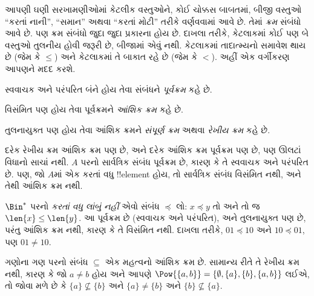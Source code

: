 \documentclass[../../../include/open-logic-section]{subfiles}
\begin{document}

\begin{explain}
આપણી ઘણી સરખામણીઓમાં કેટલીક વસ્તુઓને, કોઈ ચોક્કસ બાબતમાં,
બીજી વસ્તુઓ “કરતાં નાની”, “સમાન” અથવા “કરતાં મોટી”
તરીકે વર્ણવવામાં આવે છે. તેમાં \emph{ક્રમ} સંબંધો આવે છે.
પણ ક્રમ સંબંધો જુદા જુદા પ્રકારના હોય છે. દાખલા તરીકે,
કેટલાકમાં કોઈ પણ બે વસ્તુઓ તુલનીય હોવી જરૂરી છે,
બીજામાં એવું નથી. કેટલાકમાં તાદાત્મ્યનો સમાવેશ થાય છે
(જેમ કે $\le$) અને કેટલાકમાં તે બાકાત રહે છે (જેમ કે $<$).
અહીં એક વર્ગીકરણ આપણને મદદ કરશે.
\end{explain}

\begin{defn}[પૂર્વક્રમ]
સ્વવાચક અને પરંપરિત બંને હોય તેવા સંબંધને \emph{પૂર્વક્રમ} કહે છે.
\end{defn}

\begin{defn}[આંશિક ક્રમ]
વિસંમિત પણ હોય તેવા પૂર્વક્રમને \emph{આંશિક ક્રમ} કહે છે.
\end{defn}

\begin{defn}[રેખીય ક્રમ]
તુલનાયુક્ત પણ હોય તેવા આંશિક ક્રમને \emph{સંપૂર્ણ ક્રમ}
અથવા \emph{રેખીય ક્રમ} કહે છે.
\end{defn}

\begin{ex}
દરેક રેખીય ક્રમ આંશિક ક્રમ પણ છે, અને દરેક આંશિક ક્રમ
પૂર્વક્રમ પણ છે, પણ ઊલટાં વિધાનો સાચાં નથી.
$A$ પરનો સાર્વત્રિક સંબંધ પૂર્વક્રમ છે, કારણ કે તે સ્વવાચક
અને પરંપરિત છે. પણ, જો $A$માં એક કરતાં વધુ !!{element}
હોય, તો સાર્વત્રિક સંબંધ વિસંમિત નથી, અને તેથી આંશિક ક્રમ નથી.
\end{ex}

\begin{ex}
$\Bin^*$ પરનો \emph{કરતાં વધુ લાંબું નહીં} એવો સંબંધ
$\preccurlyeq$ લો: $x \preccurlyeq y$ તો અને તો જ
$\len{x} \le \len{y}$. આ પૂર્વક્રમ છે (સ્વવાચક અને પરંપરિત),
અને તુલનાયુક્ત પણ છે, પરંતુ આંશિક ક્રમ નથી,
કારણ કે તે વિસંમિત નથી. દાખલા તરીકે,
$01 \preccurlyeq 10$ અને $10 \preccurlyeq 01$,
પણ $01 \neq 10$.
\end{ex}

\begin{ex}
ગણોના ગણ પરનો સંબંધ $\subseteq$ એક મહત્વનો આંશિક ક્રમ છે.
સામાન્ય રીતે તે રેખીય ક્રમ નથી, કારણ કે જો $a \neq b$ હોય
અને આપણે $\Pow{\{a, b\}} = \{\emptyset, \{a\}, \{b\}, \{a,b\}\}$
લઈએ, તો જોવા મળે છે કે $\{a\} \nsubseteq \{b\}$ અને
$\{a\} \neq \{b\}$ અને $\{b\} \nsubseteq \{a\}$.
\end{ex}
\end{document}
